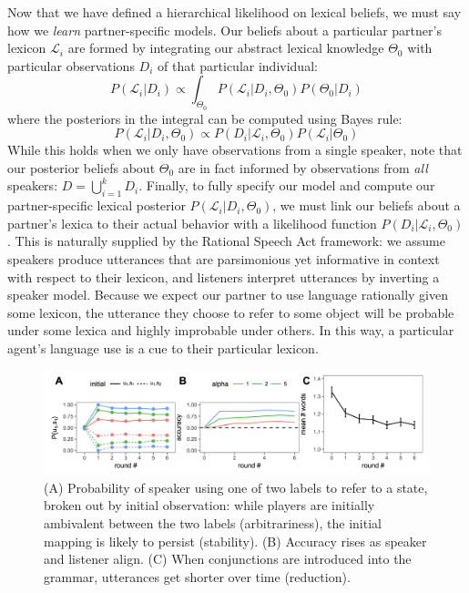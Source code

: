 \documentclass[11pt]{article}
\begin{document}
Now that we have defined a hierarchical likelihood on lexical beliefs, we must say how we \emph{learn} partner-specific models. Our beliefs about a particular partner's lexicon $\mathcal{L}_i$ are formed by integrating our abstract lexical knowledge $\Theta_0$ with particular  observations $D_i$ of that particular individual:
$$%
P(\mathcal{L}_i | D_i)  \propto \int_{\Theta_0}P(\mathcal{L}_i | D_i,  \Theta_0) P(\Theta_0 | D_i) 
$$
where the posteriors in the integral can be computed using Bayes rule:
$$
P(\mathcal{L}_i | D_i, \Theta_0) \propto P(D_i | \mathcal{L}_i, \Theta_0) P(\mathcal{L}_i | \Theta_0)
$$
While this holds when we only have observations from a single speaker, note that our posterior beliefs about $\Theta_0$ are in fact informed by observations from \emph{all} speakers: $D = \bigcup_{i=1}^k D_i$. Finally, to fully specify our model and compute our partner-specific lexical posterior $P(\mathcal{L}_i |D_i, \Theta_0)$, we must link our beliefs about a partner's lexica to their actual behavior with a likelihood function $P(D_i | \mathcal{L}_i, \Theta_0)$. This is naturally supplied by the Rational Speech Act framework: we assume speakers produce utterances that are parsimonious yet informative in context with respect to their lexicon, and listeners interpret utterances by inverting a speaker model. Because we expect our partner to use language rationally given some lexicon, the utterance they choose to refer to some object will be probable under some lexica and highly improbable under others. In this way, a particular agent's language use is a cue to their particular lexicon. 

\begin{figure}[t]
\centering
\includegraphics[scale=.36]{model_results.png}
\caption{ (A) Probability of speaker using one of two labels to refer to a state, broken out by initial observation: while players are initially ambivalent between the two labels (arbitrariness), the initial mapping is likely to persist (stability). (B) Accuracy rises as speaker and listener align. (C) When conjunctions are introduced into the grammar, utterances get shorter over time (reduction).}
\label{fig:modelresults}
\end{figure}
\end{document}
